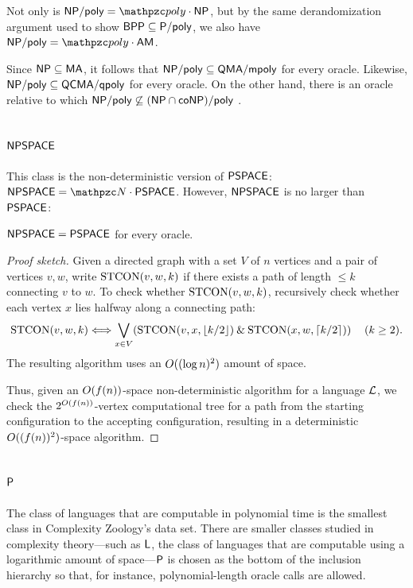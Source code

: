Not only is $\NP/\poly=\cpoly\cdot\NP$, but by the same derandomization argument 
used to show $\mathsf{BPP}\subseteq\mathsf{P}/\mathsf{poly}$, we also have 
$\NP/\poly=\cpoly\cdot\msf{AM}$.

Since $\mathsf{NP}\subseteq\mathsf{MA}$, it follows that 
$\mathsf{NP}/\mathsf{poly}\subseteq\mathsf{QMA}/\mathsf{mpoly}$ for every oracle. Likewise, 
$\mathsf{NP}/\mathsf{poly}\subseteq\mathsf{QCMA}/\mathsf{qpoly}$ for every oracle. On the other hand, 
there is an oracle relative to which 
$\mathsf{NP}/\mathsf{poly}\not\subseteq(\mathsf{NP}\cap\mathsf{co}\mathsf{NP})/\mathsf{poly}$ \cite{fenner2003oracle}.

\subsection{$\mathsf{NPSPACE}$} \label{npspace-subsection}

This class is the non-deterministic version of $\mathsf{PSPACE}$: 
$\msf{NPSPACE}=\cN\cdot\msf{PSPACE}$. However, $\mathsf{NPSPACE}$ is no larger than
$\mathsf{PSPACE}$:
\begin{theorem}
$\mathsf{NPSPACE}=\mathsf{PSPACE}$ for every oracle.
\end{theorem}
\begin{proof}[Proof sketch]
Given a directed graph with a set $V$ of $n$ vertices and a pair of vertices 
$v,w$, write $\operatorname{STCON}(v,w,k)$ if there exists a path of length $\leq k$ connecting 
$v$ to $w$. To check whether $\operatorname{STCON}(v,w,k)$, recursively check whether each 
vertex $x$ lies halfway along a connecting path:
\[
\operatorname{STCON}(v,w,k)\Longleftrightarrow
\bigvee_{x\in V}(\operatorname{STCON}(v,x,\lfloor k/2\rfloor)\mathbin{\&}
\operatorname{STCON}(x,w,\lceil k/2\rceil))\hspace{12pt}(k\geq 2).
\]
The resulting algorithm uses an $O((\log n)^2)$ amount of space.

Thus, given an $O(f(n))$-space non-deterministic algorithm for a language $\mathcal{L}$,
we check the $2^{O(f(n))}$-vertex computational tree for a path from the 
starting configuration to the accepting configuration, resulting in a 
deterministic $O((f(n))^2)$-space algorithm.
\end{proof}

\subsection{$\mathsf{P}$}

The class of languages that are computable in polynomial time is the smallest 
class in Complexity Zoology's data set. There are smaller classes studied in 
complexity theory---such as $\mathsf{L}$, the class of languages that are 
computable using a logarithmic amount of space---$\mathsf{P}$ is chosen as the bottom 
of the inclusion hierarchy so that, for instance, polynomial-length oracle calls
are allowed.

